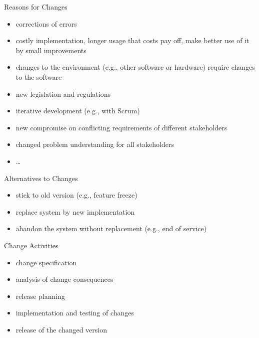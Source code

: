 \begin{frame}{\insertsubsection}
	\begin{fancycolumns}
		\begin{definition}{Reasons for Changes \mysource{\sommerville}}
			\begin{itemize}
				\item corrections of errors
				\item costly implementation, longer usage that costs pay off, make better use of it by small improvements
				\item changes to the environment (e.g., other software or hardware) require changes to the software
				\item new legislation and regulations
				\item iterative development (e.g., with Scrum)
				\item new compromise on conflicting requirements of different stakeholders
				\item changed problem understanding for all stakeholders
				\item \ldots
			\end{itemize}
		\end{definition}
		\nextcolumn
		\begin{note}{Alternatives to Changes}
			\begin{itemize}
				\item stick to old version (e.g., feature freeze)
				\item replace system by new implementation
				\item abandon the system without replacement (e.g., end of service)
			\end{itemize}
		\end{note}
		\begin{definition}{Change Activities \mysource{\sommerville}}
			\begin{itemize}
				\item change specification
				\item analysis of change consequences
				\item release planning
				\item implementation and testing of changes
				\item release of the changed version
			\end{itemize}
		\end{definition}
	\end{fancycolumns}
\end{frame}

